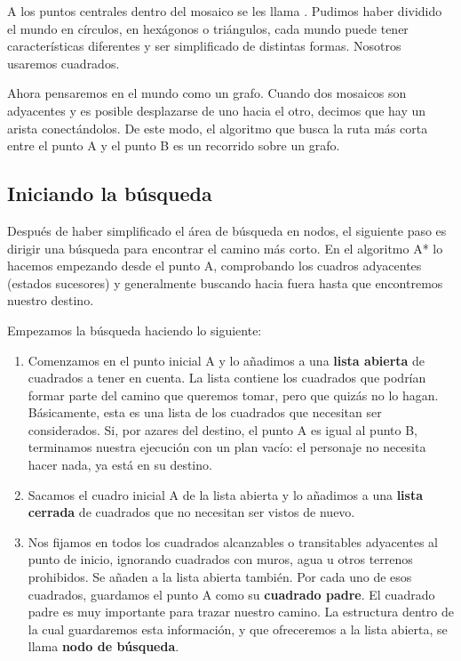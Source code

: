 A los puntos centrales dentro del mosaico se les llama . Pudimos haber dividido el mundo en círculos, en hexágonos o triángulos, cada mundo puede tener características diferentes y ser simplificado de distintas formas.  Nosotros usaremos cuadrados.

Ahora pensaremos en el mundo como un grafo.  Cuando dos mosaicos son adyacentes y es posible desplazarse de uno hacia el otro, decimos que hay un arista conectándolos.  De este modo, el algoritmo que busca la ruta más corta entre el punto A y el punto B es un recorrido sobre un grafo.

\subsection{Iniciando la b\'usqueda}

Después de haber simplificado el área de búsqueda en nodos, el siguiente paso es dirigir una búsqueda para encontrar el camino más corto. En el algoritmo A* lo hacemos empezando desde el punto A, comprobando los cuadros adyacentes (estados sucesores) y generalmente buscando hacia fuera hasta que encontremos nuestro destino.

\noindent Empezamos la búsqueda haciendo lo siguiente:

\begin{enumerate}
  \item Comenzamos en el punto inicial A y lo añadimos a una \textbf{lista abierta} de cuadrados a tener en cuenta. La lista contiene los cuadrados que podrían formar parte del camino que queremos tomar, pero que quizás no lo hagan. Básicamente, esta es una lista de los cuadrados que necesitan ser considerados. Si, por azares del destino, el punto A es igual al punto B, terminamos nuestra ejecución con un plan vacío: el personaje no necesita hacer nada, ya está en su destino.
  
  \item Sacamos el cuadro inicial A de la lista abierta y lo añadimos a una \textbf{lista cerrada} de cuadrados que no necesitan ser vistos de nuevo.
  
  \item Nos fijamos en todos los cuadrados alcanzables o transitables adyacentes al punto de inicio, ignorando cuadrados con muros, agua u otros terrenos prohibidos. Se añaden a la lista abierta también. Por cada uno de esos cuadrados, guardamos el punto A como su \textbf{cuadrado padre}. El cuadrado padre es muy importante para trazar nuestro camino.  La estructura dentro de la cual guardaremos esta información, y que ofreceremos a la lista abierta, se llama \textbf{nodo de búsqueda}.
\end{enumerate}

